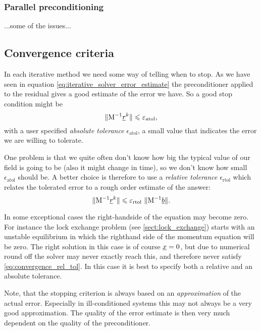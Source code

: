 \subsubsection{Parallel preconditioning}
...some of the issues...

\subsection{Convergence criteria}
In each iterative method we need some way of telling when to stop.
As we have seen in equation \eqref{eq:iterative_solver_error_estimate}
the preconditioner applied to the residual gives a good estimate of the
error we have. So a good stop condition might be
\begin{equation*}
  \|\mathrm{M}^{-1} \underline{r}^k\| \leqslant \varepsilon_{\text{atol}},
\end{equation*}
with a user specified 
\emph{absolute tolerance} $\epsilon_{\text{atol}}$, a small value
that indicates the error we are willing to tolerate.

One problem is that we quite often don't know how big the 
typical value of our field is going to be (also it might change in time),
so we don't know how small $\epsilon_{\text{atol}}$ should be.
A better choice is therefore to use a \emph{relative tolerance} 
$\epsilon_{\text{rtol}}$
which relates the tolerated error to a rough order estimate of the answer:
\begin{equation}\label{eq:convergence_rel_tol}
  \|\mathrm{M}^{-1} \underline{r}^k\| \leqslant 
    \varepsilon_{\text{rtol}}~ \|\mathrm{M}^{-1} \underline{b}\|.
\end{equation}

In some exceptional cases the right-handside of the equation may 
become zero. For instance the lock exchange problem 
(see \ref{sect:lock_exchange}) starts with an unstable equilibrium in which the righthand 
side of the momentum equation will be zero. The right solution in this case
is of course $\underline{x}=0$, but due to numerical round off the solver may
never exactly reach this, 
and therefore never satisfy \ref{eq:convergence_rel_tol}. In this case 
it is best to specify both a relative and an absolute tolerance.

Note, that the stopping criterion is always based on an \emph{approximation}
of the actual error. Especially in ill-conditioned systems this may not
always be a very good approximation. The quality of the error estimate is 
then very much dependent on the quality of the preconditioner.

